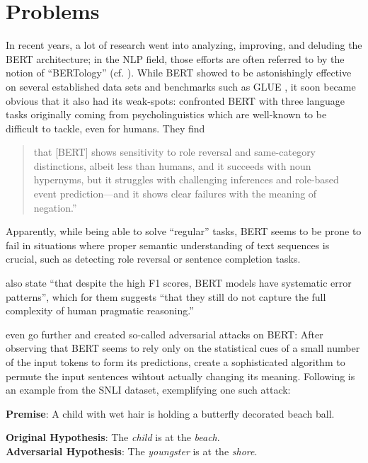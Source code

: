  \section{Problems}
\label{sec:problems}

In recent years, a lot of research went into analyzing, improving, and deluding the BERT architecture;
in the NLP field, those efforts are often referred to by the notion of ``BERTology'' (cf. \cite{rogers2020primer}).
While BERT showed to be astonishingly effective on several established data sets and benchmarks such as GLUE \citep{wang2018glue},
it soon became obvious that it also {\color{red} had} its weak-spots: \citeauthor{ettinger2020bert} confronted
BERT with three language tasks originally coming from psycholinguistics which are well-known to be difficult
to tackle, even for humans. They find

\begin{quote}
that [BERT] shows sensitivity to role reversal and
same-category distinctions, albeit less than humans, and it succeeds with noun hypernyms,
but it struggles with challenging inferences and role-based event prediction—and it shows
clear failures with the meaning of negation.'' \citep[p.~46]{ettinger2020bert}
\end{quote}

Apparently, while being able to solve ``regular'' tasks, BERT seems to be prone to fail
in situations where proper semantic understanding of text sequences is crucial, such as
detecting role reversal or sentence completion tasks.

\cite{jiang2019evaluating} also state ``that despite the high F1 scores, BERT models have
systematic error patterns'', which for them suggests ``that they still do not capture the
full complexity of human pragmatic reasoning.''

\cite{jin2020bert}even go further and created so-called adversarial attacks on BERT:
After observing that BERT seems to rely only on the statistical cues of a small number of the input tokens to
form its predictions, \citeauthor{jin2020bert} create a sophisticated algorithm to permute
the input sentences wihtout actually changing its meaning. Following is an example from the
SNLI \citep{bowman2015snli} dataset, exemplifying one such attack:

\begin{examples}
  \item \textbf{Premise}: A child with wet hair is holding a butterfly decorated beach ball.

        \textbf{Original Hypothesis}: The \emph{child} is at the \emph{beach}.\\
        \textbf{Adversarial Hypothesis}: The \emph{youngster} is at the \emph{shore}.
\end{examples}

